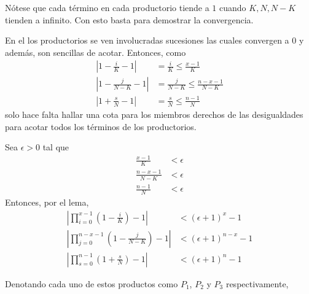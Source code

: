 \begin{Demo}
  Nótese que cada término en cada productorio tiende a $1$ cuando $K,N,N-K$
  tienden a infinito. Con esto basta para demostrar la convergencia.

  En el los productorios se ven involucradas sucesiones las cuales convergen
  a $0$ y además, son sencillas de acotar. Entonces, como
  \begin{align*}
    \left|1 - \frac{i}{K} - 1\right| &= \frac{i}{K} \leq \frac{x-1}{K}\\[10pt]
    \left|1 - \frac{j}{N-K} - 1\right| &= \frac{j}{N-K} \leq \frac{n-x-1}{N-K}\\[10pt]
    \left|1 + \frac{s}{N} - 1\right| &= \frac{s}{N} \leq \frac{n-1}{N}
  \end{align*}
  solo hace falta hallar una cota para los miembros derechos de las desigualdades para
  acotar todos los términos de los productorios.

  Sea $\epsilon>0$ tal que
  \begin{align*}
    \frac{x-1}{K}     &< \epsilon\\
    \frac{n-x-1}{N-K} &< \epsilon\\
    \frac{n-1}{N}     &< \epsilon
  \end{align*}
  Entonces, por el lema,
  \begin{align*}
    \left|\prod_{i=0}^{x-1}\left(1-\frac{i}{K}\right) - 1\right| 
    &< (\epsilon + 1)^x - 1\\[10pt]
    \left|\prod_{j=0}^{n-x-1}\left(1 - \frac{j}{N-K}\right) - 1\right|
    &< (\epsilon + 1)^{n-x} - 1\\[10pt]
    \left|\prod_{s=0}^{n-1}\left(1 + \frac{s}{N}\right) - 1\right|
    &< (\epsilon + 1)^n - 1
  \end{align*}

  Denotando cada uno de estos productos como $P_1$, $P_2$ y $P_3$ respectivamente,


\end{Demo}
